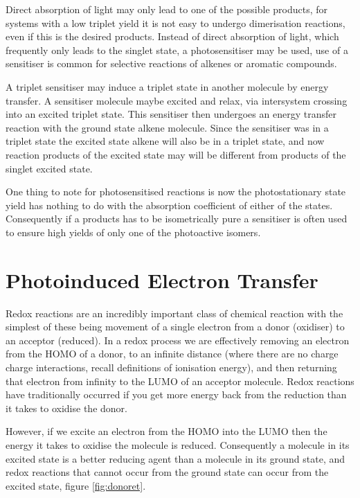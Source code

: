 \documentclass[
]{book}
\begin{document}
Direct absorption of light may only lead to one of the possible products, for systems with a low triplet yield it is not easy to undergo dimerisation reactions, even if this is the desired products. Instead of direct absorption of light, which frequently only leads to the singlet state, a photosensitiser may be used, use of a sensitiser is common for selective reactions of alkenes or aromatic compounds.

A triplet sensitiser may induce a triplet state in another molecule by energy transfer. A sensitiser molecule maybe excited and relax, via intersystem crossing into an excited triplet state. This sensitiser then undergoes an energy transfer reaction with the ground state alkene molecule. Since the sensitiser was in a triplet state the excited state alkene will also be in a triplet state, and now reaction products of the excited state may will be different from products of the singlet excited state.

One thing to note for photosensitised reactions is now the photostationary state yield has nothing to do with the absorption coefficient of either of the states. Consequently if a products has to be isometrically pure a sensitiser is often used to ensure high yields of only one of the photoactive isomers.

\hypertarget{sec:photoinducedelec}{%
\section{Photoinduced Electron Transfer}\label{sec:photoinducedelec}}

Redox reactions are an incredibly important class of chemical reaction with the simplest of these being movement of a single electron from a donor (oxidiser) to an acceptor (reduced). In a redox process we are effectively removing an electron from the HOMO of a donor, to an infinite distance (where there are no charge charge interactions, recall definitions of ionisation energy), and then returning that electron from infinity to the LUMO of an acceptor molecule. Redox reactions have traditionally occurred if you get more energy back from the reduction than it takes to oxidise the donor.

However, if we excite an electron from the HOMO into the LUMO then the energy it takes to oxidise the molecule is reduced. Consequently a molecule in its excited state is a better reducing agent than a molecule in its ground state, and redox reactions that cannot occur from the ground state can occur from the excited state, figure \ref{fig:donoret}.
\end{document}
